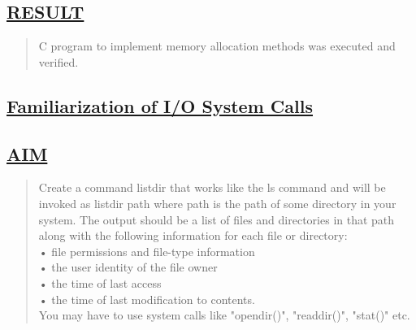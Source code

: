 \documentclass[a4paper, 12pt]{article}
\begin{document}

\subsection*{\underline{RESULT}}
\begin{quote}
C program to implement memory allocation methods was executed and verified.
\end{quote}

\newpage
\begin{center}
\section*{\LARGE \textbf{\underline{Familiarization of I/O System Calls}}} 
\end{center}

\subsection*{\underline{AIM}}
\begin{quote}
Create a command listdir that works like the ls command and will be invoked as listdir path where path is the path of some directory in your system. The output should be a list of files and directories in that path along with the following information for each file or directory:\\
• file permissions and file-type information\\
• the user identity of the file owner\\
• the time of last access\\
• the time of last modification to contents.\\
You may have to use system calls like "opendir()", "readdir()", "stat()" etc.\\
\end{quote}
\end{document}
